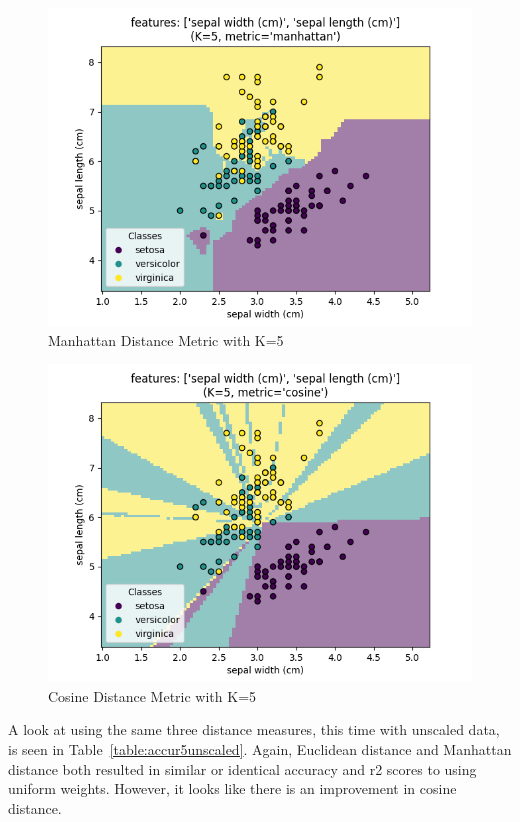 \documentclass[journal]{IEEEtran}
\begin{document}
\begin{figure}[h!]
\includegraphics[scale=0.5]{manhattan_k5.png}
\centering
\caption{Manhattan Distance Metric with K=5}
\label{fig:mank5}
\end{figure}

\begin{figure}[h!]
\includegraphics[scale=0.5]{cosine_k5.png}
\centering
\caption{Cosine Distance Metric with K=5}
\label{fig:cosk5}
\end{figure}

A look at using the same three distance measures, this time with unscaled data, is seen in Table~\ref{table:accur5unscaled}. Again, Euclidean distance and Manhattan distance both resulted in similar or identical accuracy and r2 scores to using uniform weights. However, it looks like there is an improvement in cosine distance. 
\end{document}

